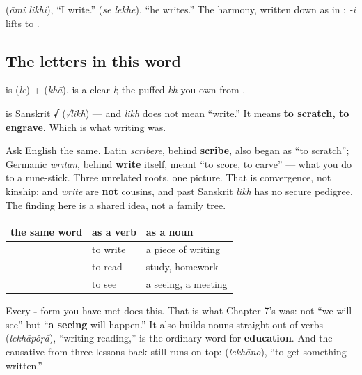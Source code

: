   (\emph{āmi likhi}), \textquotedblleft{}I write.\textquotedblright{}   (\emph{se lekhe}), \textquotedblleft{}he writes.\textquotedblright{} The harmony, written down as in : \emph{-i} lifts \textbf{} to \textbf{}.

\subsection*{The letters in this word}
\textbf{} is \textbf{} (\emph{le}) + \textbf{} (\emph{khā}). \textbf{} is a clear \emph{l}; \textbf{} the puffed \emph{kh} you own from .

\begin{cousinweb}
\textbf{} is Sanskrit \textbf{√} (\emph{√likh}) — and \emph{likh} does not mean \textquotedblleft{}write.\textquotedblright{} It means \textbf{to scratch, to engrave}. Which is what writing was.

Ask English the same. Latin \emph{scrībere}, behind \textbf{scribe}, also began as \textquotedblleft{}to scratch\textquotedblright{}; Germanic \emph{wrītan}, behind \textbf{write} itself, meant \textquotedblleft{}to score, to carve\textquotedblright{} — what you do to a rune-stick. Three unrelated roots, one picture. That is convergence, not kinship:  and \emph{write} are \textbf{not} cousins, and past Sanskrit \emph{likh} has no secure pedigree. The finding here is a shared idea, not a family tree.
\end{cousinweb}

\begin{grammarlens}[title={Grammar Lens: the dictionary form is also a noun}]
\noindent
\begin{tabularx}{\linewidth}{@{}>{\raggedright\arraybackslash}X>{\raggedright\arraybackslash}X>{\raggedright\arraybackslash}X@{}}
\toprule
\textbf{the same word} & \textbf{as a verb} & \textbf{as a noun} \\
\midrule
\bn{লেখা} & to write & a piece of writing \\
\bn{পড়া} & to read & study, homework \\
\bn{দেখা} & to see & a seeing, a meeting \\
\bottomrule
\end{tabularx}

Every \textbf{-} form you have met does this. That is what Chapter 7's \textbf{ } was: not \textquotedblleft{}we will see\textquotedblright{} but \textquotedblleft{}\textbf{a seeing} will happen.\textquotedblright{} It also builds nouns straight out of verbs — \textbf{} (\emph{lekhāpôṛā}), \textquotedblleft{}writing-reading,\textquotedblright{} is the ordinary word for \textbf{education}. And the causative from three lessons back still runs on top: \textbf{} (\emph{lekhāno}), \textquotedblleft{}to get something written.\textquotedblright{}
\end{grammarlens}

